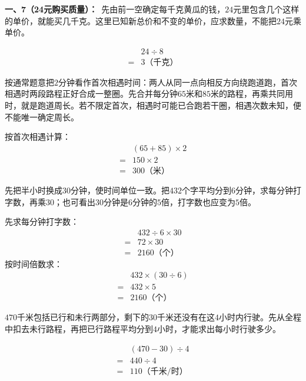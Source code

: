 \documentclass[multi=snippet,border=0pt]{standalone}
\newenvironment{snippet}[3]{\begin{minipage}{#1bp}\color{answerred}\fontsize{#2}{#3}\selectfont\raggedright}{\end{minipage}}
\begin{document}
\begin{snippet}{505}{11.5}{14}\textbf{一、7（24元购买质量）：}\ 先由前一空确定每千克黄瓜的钱，\(24\)元里包含几个这样的单价，就能买几千克。这里已知新总价和不变的单价，应求数量，不能把\(24\)元乘单价。\par \[\begin{aligned}&24\div8\\={}&3\text{（千克）}\end{aligned}\]\end{snippet}
\begin{snippet}{505}{11.5}{14}按通常题意把\(2\)分钟看作首次相遇时间：两人从同一点向相反方向绕跑道跑，首次相遇时两段路程正好合成一整圈。先合并每分钟\(65\)米和\(85\)米的路程，再乘共同用时，就是跑道周长。若不限定首次，相遇时可能已合跑若干圈，相遇次数未知，便不能唯一确定周长。\par 按首次相遇计算：\[\begin{aligned}&(65+85)\times2\\={}&150\times2\\={}&300\text{（米）}\end{aligned}\]\end{snippet}
\begin{snippet}{505}{11.5}{14}先把半小时换成\(30\)分钟，使时间单位一致。把\(432\)个字平均分到\(6\)分钟，求每分钟打字数，再乘\(30\)；也可看出\(30\)分钟是\(6\)分钟的\(5\)倍，打字数也应变为\(5\)倍。\par 先求每分钟打字数：\[\begin{aligned}&432\div6\times30\\={}&72\times30\\={}&2160\text{（个）}\end{aligned}\]按时间倍数求：\[\begin{aligned}&432\times(30\div6)\\={}&432\times5\\={}&2160\text{（个）}\end{aligned}\]\end{snippet}
\begin{snippet}{505}{11.5}{14}\(470\)千米包括已行和未行两部分，剩下的\(30\)千米还没有在这\(4\)小时内行驶。先从全程中扣去未行路程，再把已行路程平均分到\(4\)小时，才能求出每小时行驶多少。\par \[\begin{aligned}&(470-30)\div4\\={}&440\div4\\={}&110\text{（千米/时）}\end{aligned}\]\end{snippet}
\end{document}
